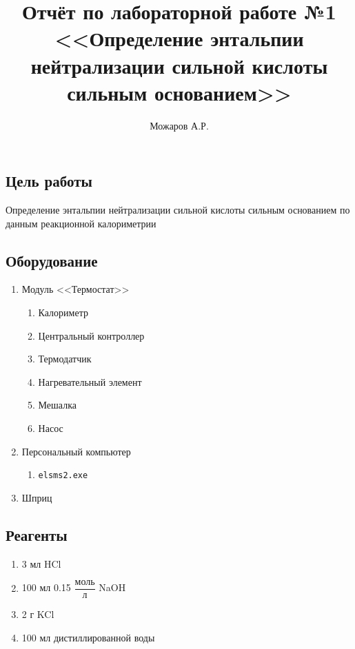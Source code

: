\documentclass[a4paper]{article}
\title{Отчёт по лабораторной работе №1\\
<<Определение энтальпии нейтрализации сильной
кислоты сильным основанием>>}
\author{Можаров А.Р.}
\begin{document}
\maketitle

\subsection*{Цель работы}

Определение энтальпии нейтрализации сильной кислоты
сильным основанием по данным реакционной калориметрии

\subsection*{Оборудование}

\begin{enumerate}
    \item Модуль <<Термостат>>
          \begin{enumerate}
              \item Калориметр
              \item Центральный контроллер
              \item Термодатчик
              \item Нагревательный элемент
              \item Мешалка
              \item Насос
          \end{enumerate}
    \item Персональный компьютер
          \begin{enumerate}
              \item \texttt{elsms2.exe}
          \end{enumerate}
    \item Шприц
\end{enumerate}

\subsection*{Реагенты}

\begin{enumerate}
    \item 3 мл HCl
    \item 100 мл 0.15 $\dfrac{\text{моль}}{\text{л}}$ NaOH
    \item 2 г KCl
    \item 100 мл дистиллированной воды
\end{enumerate}
\end{document}
